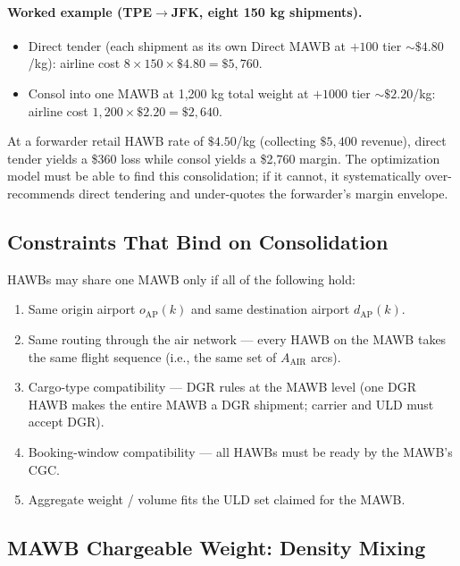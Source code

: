 \documentclass[11pt,a4paper]{article}
\theoremstyle{definition}
\begin{document}
\paragraph{Worked example (TPE\(\to\)JFK, eight 150 kg shipments).}
\begin{itemize}[noitemsep]
  \item Direct tender (each shipment as its own Direct MAWB at \(+100\) tier
        \(\sim \$4.80\)/kg): airline cost \(8 \times 150 \times \$4.80 = \$5{,}760\).
  \item Consol into one MAWB at 1{,}200 kg total weight at \(+1000\) tier
        \(\sim \$2.20\)/kg: airline cost \(1{,}200 \times \$2.20 = \$2{,}640\).
\end{itemize}
At a forwarder retail HAWB rate of \(\$4.50\)/kg (collecting \(\$5{,}400\) revenue),
direct tender yields a \$360 loss while consol yields a \$2{,}760 margin. The
optimization model must be able to find this consolidation; if it cannot, it
systematically over-recommends direct tendering and under-quotes the forwarder's
margin envelope.

\subsection{Constraints That Bind on Consolidation}

HAWBs may share one MAWB only if all of the following hold:
\begin{enumerate}[noitemsep,label=(\alph*)]
  \item Same origin airport \(o_{\text{AP}}(k)\) and same destination airport
        \(d_{\text{AP}}(k)\).
  \item Same routing through the air network — every HAWB on the MAWB takes the same
        flight sequence (i.e., the same set of \(A_{\text{AIR}}\) arcs).
  \item Cargo-type compatibility — DGR rules at the MAWB level (one DGR HAWB makes
        the entire MAWB a DGR shipment; carrier and ULD must accept DGR).
  \item Booking-window compatibility — all HAWBs must be ready by the MAWB's CGC.
  \item Aggregate weight / volume fits the ULD set claimed for the MAWB.
\end{enumerate}

\subsection{MAWB Chargeable Weight: Density Mixing}
\label{sec:mawb-cw}
\end{document}
